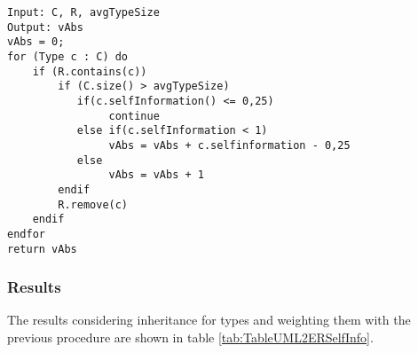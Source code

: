 \begin{lstlisting}
Input: C, R, avgTypeSize
Output: vAbs
vAbs = 0;
for (Type c : C) do
    if (R.contains(c))
        if (C.size() > avgTypeSize)						
	       if(c.selfInformation() <= 0,25)
                continue					
	       else if(c.selfInformation < 1)
                vAbs = vAbs + c.selfinformation - 0,25					
	       else
                vAbs = vAbs + 1	
        endif		
        R.remove(c)
    endif
endfor
return vAbs
\end{lstlisting}

\subsubsection{Results}

The results considering inheritance for types and weighting them with the previous procedure are shown in table \ref{tab:TableUML2ERSelfInfo}.

